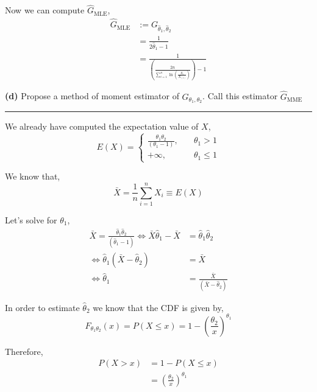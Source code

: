\documentclass[10pt, a4paper, nofootinbib]{scrartcl}
\begin{document}
Now we can compute $\hat{G}_{\text{MLE}}$,
\begin{align*}
  \hat{G}_{\text{MLE}}
    &:= G_{\hat{\theta}_1, \hat{\theta}_2} \\
    &= \frac{1}{2\hat{\theta}_1 - 1} \\
    &= \frac{1}{\left( \frac{2n}{\sum_{i=1}^{n} \ln \left(\frac{X_i}{X_{(1)}} \right)} \right) - 1} 
\end{align*}

\textbf{(d)} Propose a method of moment estimator of $G_{\theta_1, \theta_2}$. Call this estimator $\hat{G}_{\text{MME}}$

\begin{center}\rule{6cm}{0.4pt}\end{center}

We already have computed the expectation value of $X$,
\begin{equation*}
  E(X) = 
    \begin{cases}
      \frac{\theta_1 \theta_2}{(\theta_1 - 1)}, &\quad \theta_1 > 1 \\
      +\infty, &\quad \theta_1 \leq 1
    \end{cases}
\end{equation*}

We know that, 
\begin{equation*}
  \bar{X} = \frac{1}{n} \sum_{i=1}^n X_i \equiv E(X)
\end{equation*}

Let's solve for $\theta_1$,
\begin{align*}
  \bar{X} = \frac{\hat{\theta}_1 \hat{\theta}_2}{(\hat{\theta}_1 - 1)} 
    \iff \bar{X} \hat{\theta}_1 - \bar{X} &= \hat{\theta}_1 \hat{\theta}_2 \\
    \iff \hat{\theta}_1 (\bar{X} - \hat{\theta}_2) &= \bar{X} \\
    \iff \hat{\theta}_1 &= \frac{\bar{X}}{(\bar{X} - \hat{\theta}_2)}
\end{align*}

In order to estimate $\hat{\theta}_2$ we know that the CDF is given by,
\begin{equation*}
  F_{\theta_1 \theta_2}(x) = P(X \leq x) = 1 - \left( \frac{\theta_2}{x} \right)^{\theta_1}
\end{equation*}

Therefore, 
\begin{align*}
  P(X > x) 
    &= 1 - P(X \leq x) \\
    &= \left( \frac{\theta_2}{x} \right)^{\theta_1}
\end{align*}
\end{document}
